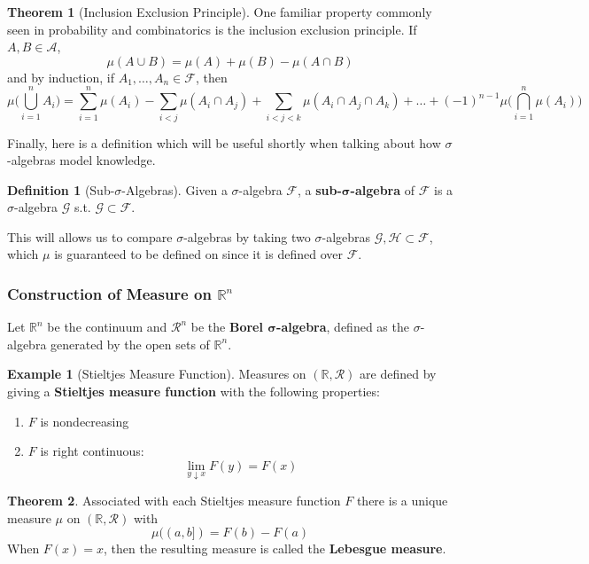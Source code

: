 \documentclass{article}
\theoremstyle{definition}
\newtheorem{theorem}{Theorem}[section]
\newtheorem{example}{Example}[section]
\theoremstyle{remark}
\theoremstyle{definition}
\newtheorem{definition}{Definition}[section]
\begin{document}
\begin{theorem}[Inclusion Exclusion Principle]
One familiar property commonly seen in probability and combinatorics is the inclusion exclusion principle. If $A, B \in \mathcal{A}$, 
\[\mu(A \cup B) = \mu(A) + \mu(B) - \mu(A \cap B)\]
and by induction, if $A_1, \ldots, A_n \in \mathcal{F}$, then 
\[\mu\bigg( \bigcup_{i=1}^n A_i \bigg) = \sum_{i=1}^n \mu(A_i) - \sum_{i < j} \mu(A_i \cap A_j) + \sum_{i < j < k} \mu(A_i \cap A_j \cap A_k) + \ldots + (-1)^{n-1} \mu\bigg( \bigcap_{i=1}^n \mu(A_i) \bigg)\]
\end{theorem}

Finally, here is a definition which will be useful shortly when talking about how $\sigma$-algebras model knowledge. 

\begin{definition}[Sub-$\sigma$-Algebras]
Given a $\sigma$-algebra $\mathcal{F}$, a \textbf{sub-$\boldsymbol{\sigma}$-algebra} of $\mathcal{F}$ is a $\sigma$-algebra $\mathcal{G}$ s.t. $\mathcal{G} \subset \mathcal{F}$. 
\end{definition}

This will allows us to compare $\sigma$-algebras by taking two $\sigma$-algebras $\mathcal{G}, \mathcal{H} \subset \mathcal{F}$, which $\mu$ is guaranteed to be defined on since it is defined over $\mathcal{F}$. 

\subsubsection[Construction of Measure on Rn]{Construction of Measure on $\mathbb{R}^n$}

Let $\mathbb{R}^n$ be the continuum and $\mathcal{R}^n$ be the \textbf{Borel $\boldsymbol{\sigma}$-algebra}, defined as the $\sigma$-algebra generated by the open sets of $\mathbb{R}^n$. 

\begin{example}[Stieltjes Measure Function]
Measures on $(\mathbb{R}, \mathcal{R})$ are defined by giving a \textbf{Stieltjes measure function} with the following properties: 
\begin{enumerate}
    \item $F$ is nondecreasing 
    \item $F$ is right continuous: 
    \[\lim_{y \downarrow x} F(y) = F(x)\]
\end{enumerate}
\end{example}

\begin{theorem}
Associated with each Stieltjes measure function $F$ there is a unique measure $\mu$ on $(\mathbb{R}, \mathcal{R})$ with 
\[\mu((a, b]) = F(b) - F(a)\]
When $F(x) = x$, then the resulting measure is called the \textbf{Lebesgue measure}. 
\end{theorem}
\end{document}
